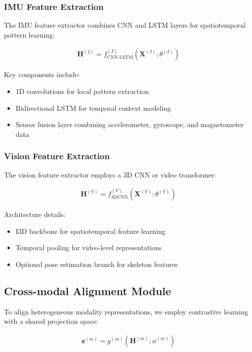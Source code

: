 \documentclass[journal]{IEEEtran}
\begin{document}
\subsubsection{IMU Feature Extraction}

The IMU feature extractor combines CNN and LSTM layers for spatiotemporal pattern learning:

\begin{align}
\mathbf{H}^{(I)} = f_{\text{CNN-LSTM}}^{(I)}(\mathbf{X}^{(I)}; \theta^{(I)})
\end{align}

Key components include:
\begin{itemize}
\item 1D convolutions for local pattern extraction
\item Bidirectional LSTM for temporal context modeling
\item Sensor fusion layer combining accelerometer, gyroscope, and magnetometer data
\end{itemize}

\subsubsection{Vision Feature Extraction}

The vision feature extractor employs a 3D CNN or video transformer:

\begin{align}
\mathbf{H}^{(V)} = f_{\text{3DCNN}}^{(V)}(\mathbf{X}^{(V)}; \theta^{(V)})
\end{align}

Architecture details:
\begin{itemize}
\item I3D backbone for spatiotemporal feature learning
\item Temporal pooling for video-level representations
\item Optional pose estimation branch for skeleton features
\end{itemize}

\subsection{Cross-modal Alignment Module}

To align heterogeneous modality representations, we employ contrastive learning with a shared projection space:

\begin{align}
\mathbf{z}^{(m)} = g^{(m)}(\mathbf{H}^{(m)}; \phi^{(m)})
\end{align}
\end{document}
